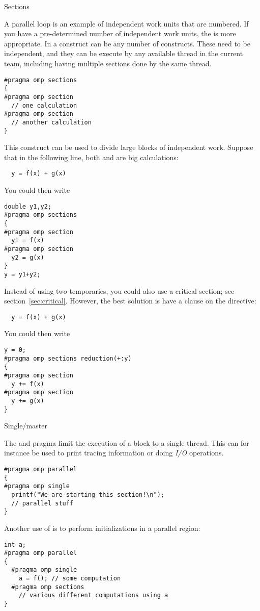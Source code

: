  {Sections}

A parallel loop is an example of independent work units that are numbered.
If you have a pre-determined number of independent work units, 
the  is more appropriate. In a  construct
can be any number of  constructs. These need to be
independent, and they can be execute by any available thread in the current team,
including having multiple sections done by the same thread.
\begin{verbatim}
#pragma omp sections
{
#pragma omp section
  // one calculation
#pragma omp section
  // another calculation
}
\end{verbatim}

This construct can be used to divide large blocks of independent work.
Suppose that in the following line, both  and 
are big calculations:
\begin{verbatim}
  y = f(x) + g(x)
\end{verbatim}
You could then write
\begin{verbatim}
double y1,y2;
#pragma omp sections
{
#pragma omp section
  y1 = f(x)
#pragma omp section
  y2 = g(x)
}
y = y1+y2;
\end{verbatim}
Instead of using two temporaries, you could also use a critical
section; see section~\ref{sec:critical}.  However, the best solution
is have a  clause on the  directive:
\begin{verbatim}
  y = f(x) + g(x)
\end{verbatim}
You could then write
\begin{verbatim}
y = 0;
#pragma omp sections reduction(+:y)
{
#pragma omp section
  y += f(x)
#pragma omp section
  y += g(x)
}
\end{verbatim}

 {Single/master}

The  and  pragma
limit the execution of a block to a single thread. 
This can for instance be used to print tracing information
or doing \emph{I/O} operations.
\begin{verbatim}
#pragma omp parallel
{
#pragma omp single
  printf("We are starting this section!\n");
  // parallel stuff
}
\end{verbatim}
Another use of  is to perform initializations
in a parallel region:
\begin{verbatim}
int a;
#pragma omp parallel
{
  #pragma omp single
    a = f(); // some computation
  #pragma omp sections
    // various different computations using a
}
\end{verbatim}

